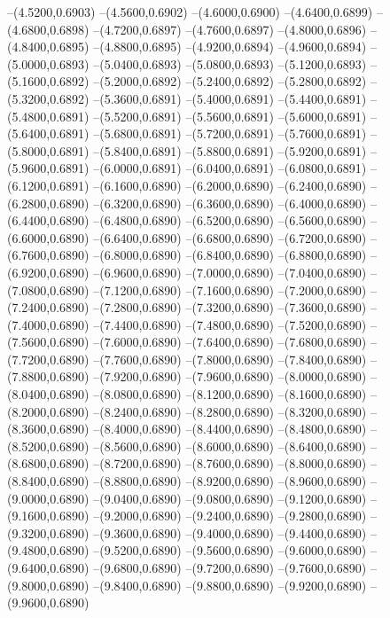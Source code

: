 {	--(4.5200,0.6903)
	--(4.5600,0.6902)
	--(4.6000,0.6900)
	--(4.6400,0.6899)
	--(4.6800,0.6898)
	--(4.7200,0.6897)
	--(4.7600,0.6897)
	--(4.8000,0.6896)
	--(4.8400,0.6895)
	--(4.8800,0.6895)
	--(4.9200,0.6894)
	--(4.9600,0.6894)
	--(5.0000,0.6893)
	--(5.0400,0.6893)
	--(5.0800,0.6893)
	--(5.1200,0.6893)
	--(5.1600,0.6892)
	--(5.2000,0.6892)
	--(5.2400,0.6892)
	--(5.2800,0.6892)
	--(5.3200,0.6892)
	--(5.3600,0.6891)
	--(5.4000,0.6891)
	--(5.4400,0.6891)
	--(5.4800,0.6891)
	--(5.5200,0.6891)
	--(5.5600,0.6891)
	--(5.6000,0.6891)
	--(5.6400,0.6891)
	--(5.6800,0.6891)
	--(5.7200,0.6891)
	--(5.7600,0.6891)
	--(5.8000,0.6891)
	--(5.8400,0.6891)
	--(5.8800,0.6891)
	--(5.9200,0.6891)
	--(5.9600,0.6891)
	--(6.0000,0.6891)
	--(6.0400,0.6891)
	--(6.0800,0.6891)
	--(6.1200,0.6891)
	--(6.1600,0.6890)
	--(6.2000,0.6890)
	--(6.2400,0.6890)
	--(6.2800,0.6890)
	--(6.3200,0.6890)
	--(6.3600,0.6890)
	--(6.4000,0.6890)
	--(6.4400,0.6890)
	--(6.4800,0.6890)
	--(6.5200,0.6890)
	--(6.5600,0.6890)
	--(6.6000,0.6890)
	--(6.6400,0.6890)
	--(6.6800,0.6890)
	--(6.7200,0.6890)
	--(6.7600,0.6890)
	--(6.8000,0.6890)
	--(6.8400,0.6890)
	--(6.8800,0.6890)
	--(6.9200,0.6890)
	--(6.9600,0.6890)
	--(7.0000,0.6890)
	--(7.0400,0.6890)
	--(7.0800,0.6890)
	--(7.1200,0.6890)
	--(7.1600,0.6890)
	--(7.2000,0.6890)
	--(7.2400,0.6890)
	--(7.2800,0.6890)
	--(7.3200,0.6890)
	--(7.3600,0.6890)
	--(7.4000,0.6890)
	--(7.4400,0.6890)
	--(7.4800,0.6890)
	--(7.5200,0.6890)
	--(7.5600,0.6890)
	--(7.6000,0.6890)
	--(7.6400,0.6890)
	--(7.6800,0.6890)
	--(7.7200,0.6890)
	--(7.7600,0.6890)
	--(7.8000,0.6890)
	--(7.8400,0.6890)
	--(7.8800,0.6890)
	--(7.9200,0.6890)
	--(7.9600,0.6890)
	--(8.0000,0.6890)
	--(8.0400,0.6890)
	--(8.0800,0.6890)
	--(8.1200,0.6890)
	--(8.1600,0.6890)
	--(8.2000,0.6890)
	--(8.2400,0.6890)
	--(8.2800,0.6890)
	--(8.3200,0.6890)
	--(8.3600,0.6890)
	--(8.4000,0.6890)
	--(8.4400,0.6890)
	--(8.4800,0.6890)
	--(8.5200,0.6890)
	--(8.5600,0.6890)
	--(8.6000,0.6890)
	--(8.6400,0.6890)
	--(8.6800,0.6890)
	--(8.7200,0.6890)
	--(8.7600,0.6890)
	--(8.8000,0.6890)
	--(8.8400,0.6890)
	--(8.8800,0.6890)
	--(8.9200,0.6890)
	--(8.9600,0.6890)
	--(9.0000,0.6890)
	--(9.0400,0.6890)
	--(9.0800,0.6890)
	--(9.1200,0.6890)
	--(9.1600,0.6890)
	--(9.2000,0.6890)
	--(9.2400,0.6890)
	--(9.2800,0.6890)
	--(9.3200,0.6890)
	--(9.3600,0.6890)
	--(9.4000,0.6890)
	--(9.4400,0.6890)
	--(9.4800,0.6890)
	--(9.5200,0.6890)
	--(9.5600,0.6890)
	--(9.6000,0.6890)
	--(9.6400,0.6890)
	--(9.6800,0.6890)
	--(9.7200,0.6890)
	--(9.7600,0.6890)
	--(9.8000,0.6890)
	--(9.8400,0.6890)
	--(9.8800,0.6890)
	--(9.9200,0.6890)
	--(9.9600,0.6890)
}
